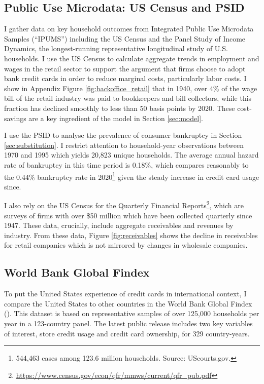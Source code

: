 \documentclass[12pt,english]{article}
\begin{document}
\subsection{Public Use Microdata: US Census and PSID}\label{subsec:ipums}

I gather data on key household outcomes from Integrated Public Use Microdata Samples (``IPUMS'') including the US Census and the Panel Study of Income Dynamics, the longest-running representative longitudinal study of U.S. households. I use the US Census to calculate aggregate trends in employment and wages in the retail sector to support the argument that firms choose to adopt bank credit cards in order to reduce marginal costs, particularly labor costs. I show in Appendix Figure \ref{fig:backoffice_retail} that in 1940, over 4\% of the wage bill of the retail industry was paid to bookkeepers and bill collectors, while this fraction has declined smoothly to less than 50 basis points by 2020. These cost-savings are a key ingredient of the model in Section \ref{sec:model}. 

I use the PSID to analyse the prevalence of consumer bankruptcy in Section \ref{sec:substitution}. I restrict attention to household-year observations between 1970 and 1995 which yields 20,823 unique households. The average annual hazard rate of bankruptcy in this time period is 0.18\%, which compares reasonably to the 0.44\% bankruptcy rate in 2020\footnote{544,463 cases among 123.6 million households. Source: UScourts.gov.} given the steady increase in credit card usage since. 

I also rely on the US Census for the Quarterly Financial Reports\footnote{\url{https://www.census.gov/econ/qfr/mmws/current/qfr_pub.pdf}}, which are surveys of firms with over \$50 million which have been collected quarterly since 1947. These data, crucially, include aggregate receivables and revenues by industry. From these data, Figure \ref{fig:receivables} shows the decline in receivables for retail companies which is not mirrored by changes in wholesale companies. 

\subsection{World Bank Global Findex}

To put the United States experience of credit cards in international context, I compare the United States to other countries in the World Bank Global Findex (\cite{global_findex_2021}). This dataset is based on representative samples of over 125,000 households per year in a 123-country panel. The latest public release includes two key variables of interest, store credit usage and credit card ownership, for 329 country-years. 
\end{document}
